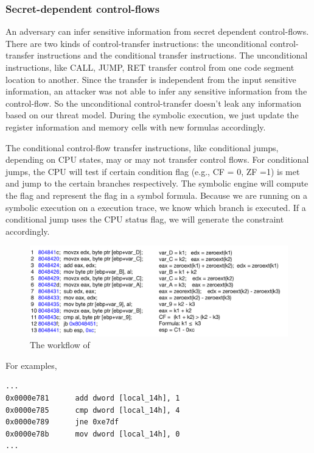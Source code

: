 \subsubsection{Secret-dependent control-flows}
An adversary can infer sensitive information from secret dependent control-flows. 
There are two kinds of control-transfer instructions: the unconditional 
control-transfer instructions and the conditional transfer instructions.
The unconditional instructions, like CALL, JUMP, RET transfer control
from one code segment location to another. Since the transfer is 
independent from the input sensitive information, an attacker was 
not able to infer any sensitive information from the control-flow. 
So the unconditional control-transfer doesn't leak any information 
based on our threat model. During the symbolic execution, 
we just update the register information and memory cells with 
new formulas accordingly.

The conditional control-flow transfer instructions, like conditional jumps,
depending on CPU states, may or may not transfer control flows.
For conditional jumps, the CPU will test if certain condition flag 
(e.g., CF = 0, ZF =1) is met and jump to the certain branches respectively.
The symbolic engine will compute the flag and represent the flag 
in a symbol formula. Because we are running on a symbolic execution 
on a execution trace, we know which branch is executed.
If a conditional jump uses the CPU status flag, we will generate 
the constraint accordingly.

\begin{figure}[ht]
      \centering
      \includegraphics[width=\columnwidth]{./figures/secretCF.pdf}
      \caption{The workflow of \tool{}}
      \label{fig:Test}
  \end{figure}

For examples,

\begin{lstlisting}
...
0x0000e781      add dword [local_14h], 1
0x0000e785      cmp dword [local_14h], 4
0x0000e789      jne 0xe7df
0x0000e78b      mov dword [local_14h], 0
...
\end{lstlisting}

